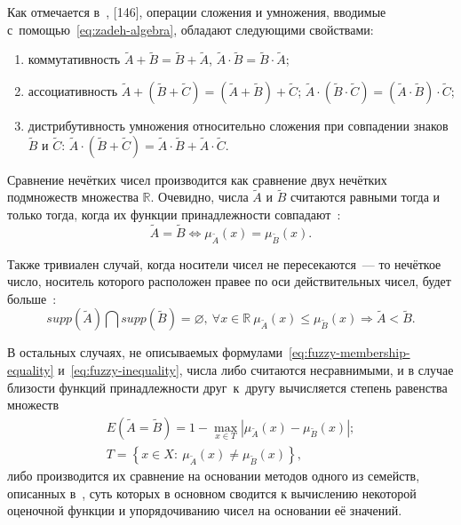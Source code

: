 Как отмечается в~\cite{Pospelov, Borisov_Alexeev_Msk, Yakhyaeva}, [146], операции сложения и умножения, вводимые с~помощью~\eqref{eq:zadeh-algebra}, обладают следующими свойствами:
\begin{enumerate}
	\item коммутативность $\tilde{A}+\tilde{B}=\tilde{B}+\tilde{A}$, $\tilde{A}\cdot \tilde{B}=\tilde{B}\cdot \tilde{A}$;
	\item ассоциативность $\tilde{A}+\left( \tilde{B}+\tilde{C} \right)=\left( \tilde{A}+\tilde{B} \right)+\tilde{C}$; $\tilde{A}\cdot \left( \tilde{B}\cdot \tilde{C} \right)=\left( \tilde{A}\cdot \tilde{B} \right)\cdot \tilde{C}$;
	\item дистрибутивность умножения относительно сложения при совпадении знаков $\tilde{B}$ и $\tilde{C}$: $\tilde{A}\cdot \left( \tilde{B}+\tilde{C} \right)=\tilde{A}\cdot \tilde{B}+\tilde{A}\cdot \tilde{C}$.
\end{enumerate}

Сравнение нечётких чисел производится как сравнение двух нечётких подмножеств множества $\mathbb{R}$. Очевидно, числа $\tilde A$ и $\tilde B$ считаются равными тогда и только тогда, когда их функции принадлежности совпадают~\cite{Ibragimov}:
\begin{equation}
\label{eq:fuzzy-membership-equality}
  \tilde A = \tilde B \Leftrightarrow \mu_{\tilde A} \left( x \right) = \mu_{\tilde B} \left( x \right).
\end{equation}

Также тривиален случай, когда носители чисел не пересекаются~--- то нечёткое число, носитель которого расположен правее по оси действительных чисел, будет больше~\cite{Ibragimov}:
\begin{equation}
\label{eq:fuzzy-inequality}
  supp \left( \tilde A \right) \bigcap supp \left( \tilde B \right) = \varnothing,\ \forall x \in \mathbb{R}\ \mu_{\tilde A} \left( x \right) \leqslant \mu_{\tilde B} \left( x \right) \Rightarrow \tilde A < \tilde B.
\end{equation}

В остальных случаях, не описываемых формулами~\eqref{eq:fuzzy-membership-equality} и~\eqref{eq:fuzzy-inequality}, числа либо считаются несравнимыми, и в случае близости функций принадлежности друг~к~другу вычисляется степень равенства множеств~\cite{Rutkovskaya}
\begin{gather*}
  E\left(\tilde A = \tilde B \right)=1 - \underset{x \in T} {\mathop{\max}} \left| \mu_{\tilde A} \left( x \right) - \mu_{\tilde B} \left( x \right) \right|; \\
  T = \left \{ x \in X:\ \mu_{\tilde A} \left( x \right) \neq \mu_{\tilde B} \left( x \right) \right \},
\end{gather*}
либо производится их сравнение на основании методов одного из семейств, описанных в~\cite{Vorontsov_Compare, Cheng_Comparison}, суть которых в основном сводится к вычислению некоторой оценочной функции и упорядочиванию чисел на основании её значений.

